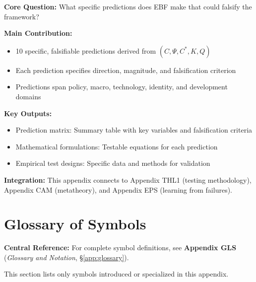 \begin{tcolorbox}[colback=green!10!white, colframe=green!75!black,
    title=\textbf{Appendix SUN: Summary}]

\textbf{Core Question:} What specific predictions does EBF make that could falsify the framework?

\textbf{Main Contribution:}
\begin{itemize}[nosep]
    \item 10 specific, falsifiable predictions derived from $(C, \Psi, C^*, K, Q)$
    \item Each prediction specifies direction, magnitude, and falsification criterion
    \item Predictions span policy, macro, technology, identity, and development domains
\end{itemize}

\textbf{Key Outputs:}
\begin{itemize}[nosep]
    \item Prediction matrix: Summary table with key variables and falsification criteria
    \item Mathematical formulations: Testable equations for each prediction
    \item Empirical test designs: Specific data and methods for validation
\end{itemize}

\textbf{Integration:} This appendix connects to Appendix THL1 (testing methodology), Appendix CAM (metatheory), and Appendix EPS (learning from failures).

\end{tcolorbox}


\section{Glossary of Symbols}
\label{sec:S-glossary}

\begin{tcolorbox}[colback=blue!5!white, colframe=blue!75!black]
\textbf{Central Reference:} For complete symbol definitions, see
\textbf{Appendix GLS} (\textit{Glossary and Notation}, \S\ref{app:glossary}).

This section lists only symbols introduced or specialized in this appendix.
\end{tcolorbox}

